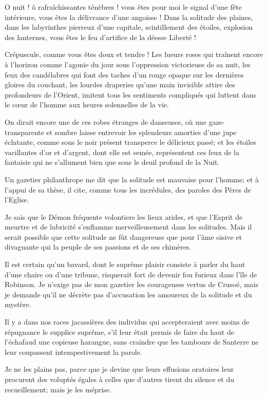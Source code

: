 O nuit ! ô rafraîchissantes ténèbres ! vous êtes pour moi le signal
d’une fête intérieure, vous êtes la délivrance
d’une angoisse ! Dans la solitude des plaines, dans
les labyrinthes pierreux d’une capitale, scintillement
des étoiles, explosion des lanternes, vous êtes le feu
d’artifice de la déesse Liberté !

Crépuscule, comme vous êtes doux et tendre ! Les lueurs roses qui
traînent encore à l’horizon comme
l’agonie du jour sous l’oppression
victorieuse de sa nuit, les feux des candélabres qui font des taches
d’un rouge opaque sur les dernières gloires du
couchant, les lourdes draperies qu’une main invisible
attire des profondeurs de l’Orient, imitent tous les
sentiments compliqués qui luttent dans le c\oe ur de
l’homme aux heures solennelles de la vie.

On dirait encore une de ces robes étranges de danseuses, où une gaze{}-
transparente et sombre laisse entrevoir les splendeurs amorties
d’une jupe éclatante, comme sous le noir présent
transperce le délicieux passé; et les étoiles vacillantes
d’or et d’argent, dont elle est
semée, représentent ces feux de la fantaisie qui ne
s’allument bien que sous le deuil profond de la Nuit.


Un gazetier philanthrope me dit que la solitude est mauvaise pour
l’homme; et à l’appui de sa thèse, il
cite, comme tous les incrédules, des paroles des Pères de
l’Eglise.

Je sais que le Démon fréquente volontiers les lieux arides, et que
l’Esprit de meurtre et de lubricité
s’enflamme merveilleusement dans les solitudes. Mais
il serait possible que cette solitude ne fût dangereuse que pour
l’âme oisive et divaguante qui la peuple de ses
passions et de ses chimères.

Il est certain qu’un bavard, dont le suprême plaisir
consiste à parler du haut d’une chaire ou
d’une tribune, risquerait fort de devenir fou furieux
dans l’île de Robinson. Je n’exige
pas de mon gazetier les courageuses vertus de Crusoé, mais je demande
qu’il ne décrète pas d’accusation les
amoureux de la solitude et du mystère.

Il y a dans nos races jacassières des individus qui accepteraient avec
moins de répugnance le supplice suprême, s’il leur
était permis de faire du haut de l’échafaud une
copieuse harangue, sans craindre que les tambours de Santerre ne leur
coupassent intempestivement la parole.

Je ne les plains pas, parce que je devine que leurs effusions oratoires
leur procurent des voluptés égales à celles que
d’autres tirent du silence et du recueillement; mais
je les méprise.

